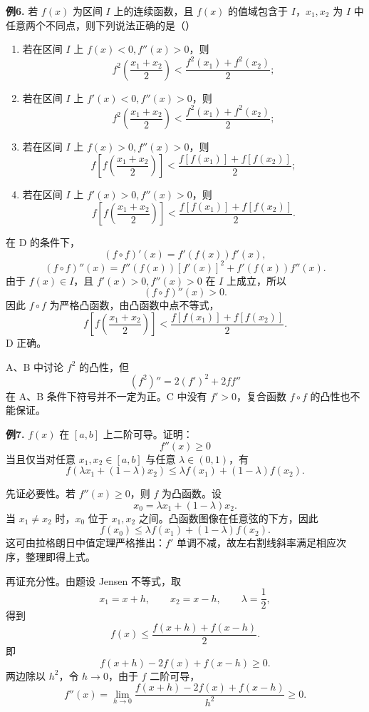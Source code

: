 \begin{problemblock}
\textbf{例6.} 若 \(f(x)\) 为区间 \(I\) 上的连续函数，且 \(f(x)\) 的值域包含于 \(I\)，\(x_1,x_2\) 为 \(I\) 中任意两个不同点，则下列说法正确的是（\quad）
\begin{enumerate}[label=\Alph*., leftmargin=2.2em]
\item 若在区间 \(I\) 上 \(f(x)<0,f''(x)>0\)，则
\[
f^2\left(\frac{x_1+x_2}{2}\right)
<\frac{f^2(x_1)+f^2(x_2)}2;
\]
\item 若在区间 \(I\) 上 \(f'(x)<0,f''(x)>0\)，则
\[
f^2\left(\frac{x_1+x_2}{2}\right)
<\frac{f^2(x_1)+f^2(x_2)}2;
\]
\item 若在区间 \(I\) 上 \(f(x)>0,f''(x)>0\)，则
\[
f\left[f\left(\frac{x_1+x_2}{2}\right)\right]
<\frac{f[f(x_1)]+f[f(x_2)]}{2};
\]
\item 若在区间 \(I\) 上 \(f'(x)>0,f''(x)>0\)，则
\[
f\left[f\left(\frac{x_1+x_2}{2}\right)\right]
<\frac{f[f(x_1)]+f[f(x_2)]}{2}.
\]
\end{enumerate}
\end{problemblock}
\begin{solutionblock}
在 D 的条件下，
\[
(f\circ f)'(x)=f'(f(x))f'(x),
\]
\[
(f\circ f)''(x)
=f''(f(x))[f'(x)]^2+f'(f(x))f''(x).
\]
由于 \(f(x)\in I\)，且 \(f'(x)>0,f''(x)>0\) 在 \(I\) 上成立，所以
\[
(f\circ f)''(x)>0.
\]
因此 \(f\circ f\) 为严格凸函数，由凸函数中点不等式，
\[
f\left[f\left(\frac{x_1+x_2}{2}\right)\right]
<
\frac{f[f(x_1)]+f[f(x_2)]}{2}.
\]
D 正确。

A、B 中讨论 \(f^2\) 的凸性，但
\[
(f^2)''=2(f')^2+2ff''
\]
在 A、B 条件下符号并不一定为正。C 中没有 \(f'>0\)，复合函数 \(f\circ f\) 的凸性也不能保证。
\end{solutionblock}

\begin{problemblock}
\textbf{例7.} \(f(x)\) 在 \([a,b]\) 上二阶可导。证明：
\[
f''(x)\ge0
\]
当且仅当对任意 \(x_1,x_2\in[a,b]\) 与任意 \(\lambda\in(0,1)\)，有
\[
f(\lambda x_1+(1-\lambda)x_2)
\le
\lambda f(x_1)+(1-\lambda)f(x_2).
\]
\end{problemblock}
\begin{solutionblock}
先证必要性。若 \(f''(x)\ge0\)，则 \(f\) 为凸函数。设
\[
x_0=\lambda x_1+(1-\lambda)x_2.
\]
当 \(x_1\ne x_2\) 时，\(x_0\) 位于 \(x_1,x_2\) 之间。凸函数图像在任意弦的下方，因此
\[
f(x_0)\le \lambda f(x_1)+(1-\lambda)f(x_2).
\]
这可由拉格朗日中值定理严格推出：\(f'\) 单调不减，故左右割线斜率满足相应次序，整理即得上式。

再证充分性。由题设 Jensen 不等式，取
\[
x_1=x+h,\qquad x_2=x-h,\qquad \lambda=\frac12,
\]
得到
\[
f(x)\le\frac{f(x+h)+f(x-h)}2.
\]
即
\[
f(x+h)-2f(x)+f(x-h)\ge0.
\]
两边除以 \(h^2\)，令 \(h\to0\)，由于 \(f\) 二阶可导，
\[
f''(x)=\lim_{h\to0}\frac{f(x+h)-2f(x)+f(x-h)}{h^2}\ge0.
\]
\end{solutionblock}

